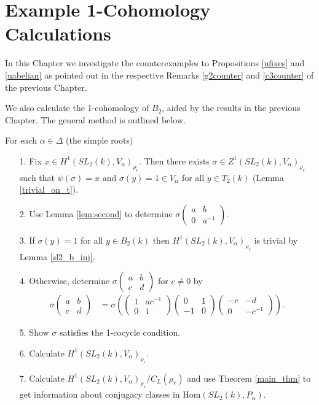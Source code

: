 
\chapter{Example 1-Cohomology Calculations}
\label{Chapter6}
In this Chapter we investigate the counterexamples to Propositions \ref{ufixes} and \ref{uabelian} as pointed out in the respective Remarks \ref{g2counter} and \ref{c3counter} of the previous Chapter.

We also calculate the 1-cohomology of $B_2$, aided by the results in the previous Chapter. The general method is outlined below.

For each $\alpha \in \Delta$ (the simple roots)
	\begin{itemize}
	\item[1.] Fix $x\in H^1(SL_2(k), V_\alpha)_{\rho_r}$. Then there exists $\sigma\in Z^1(SL_2(k), V_\alpha)_{\rho_r}$ such that $\psi(\sigma) = x$ and $\sigma\left(y\right) = 1 \in V_\alpha$ for all $y\in T_2(k)$ (Lemma \ref{trivial_on_t}).
	\item[2.] Use Lemma \ref{lem:second} to determine $\sigma\left(\begin{matrix}a & b\\0 & a^{-1}\end{matrix}\right)$. 
	\item[3.] If $\sigma\left(y\right) = 1$ for all $y\in B_2(k)$ then $H^1(SL_2(k), V_\alpha)_{\rho_r}$ is trivial by Lemma \ref{sl2_b_inj}.
	\item[4.] Otherwise, determine $\sigma\left(\begin{matrix}a & b\\c & d\end{matrix}\right)$ for $c \neq 0$ by
	\begin{align*}
	\sigma\left(\begin{matrix}a & b\\c & d\end{matrix}\right) &= \sigma\left(
			\left(\begin{matrix}1 & ac^{-1}\\0 & 1\end{matrix}\right)
			\left(\begin{matrix}0 & 1\\-1 & 0\end{matrix}\right)
			\left(\begin{matrix}-c & -d\\0 & -c^{-1}\end{matrix}\right)
			\right).
	\end{align*}
	\item[5.] Show $\sigma$ satisfies the 1-cocycle condition.
	\item[6.] Calculate $H^1(SL_2(k), V_\alpha)_{\rho_r}$.
	\item[7.] Calculate $H^1(SL_2(k), V_\alpha)_{\rho_r}/C_L(\rho_r)$ and use Theorem \ref{main_thm} to get information about conjugacy classes in $\mathrm{Hom}(SL_2(k), P_\alpha)$.
	\end{itemize}
